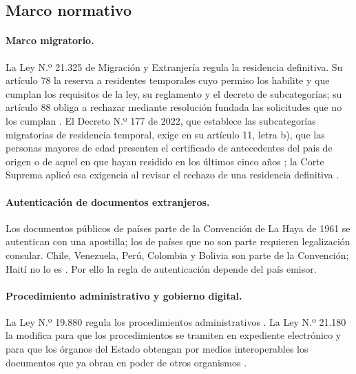 \documentclass[11pt,a4paper]{article}
\begin{document}
\subsection{Marco normativo}

\paragraph{Marco migratorio.} La Ley N.º 21.325 de Migración y Extranjería regula la residencia definitiva. Su artículo 78 la reserva a residentes temporales cuyo permiso los habilite y que cumplan los requisitos de la ley, su reglamento y el decreto de subcategorías; su artículo 88 obliga a rechazar mediante resolución fundada las solicitudes que no los cumplan \cite{ley21325}. El Decreto N.º 177 de 2022, que establece las subcategorías migratorias de residencia temporal, exige en su artículo 11, letra b), que las personas mayores de edad presenten el certificado de antecedentes del país de origen o de aquel en que hayan residido en los últimos cinco años \cite{decreto177}; la Corte Suprema aplicó esa exigencia al revisar el rechazo de una residencia definitiva \cite{cs2026}.

\paragraph{Autenticación de documentos extranjeros.} Los documentos públicos de países parte de la Convención de La Haya de 1961 se autentican con una apostilla; los de países que no son parte requieren legalización consular. Chile, Venezuela, Perú, Colombia y Bolivia son parte de la Convención; Haití no lo es \cite{hcch2026}. Por ello la regla de autenticación depende del país emisor.

\paragraph{Procedimiento administrativo y gobierno digital.} La Ley N.º 19.880 regula los procedimientos administrativos \cite{ley19880}. La Ley N.º 21.180 la modifica para que los procedimientos se tramiten en expediente electrónico y para que los órganos del Estado obtengan por medios interoperables los documentos que ya obran en poder de otros organismos \cite{ley21180}.
\end{document}
